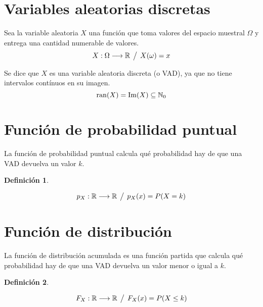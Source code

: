 \documentclass[a5paper,12pt,twoside]{book}
\newtheorem{defn}{{Definición}}[chapter]
\begin{document}
\section{Variables aleatorias discretas}

Sea la variable aleatoria $X$ una función que toma valores del espacio muestral $\Omega$ y entrega una cantidad numerable de valores.
\begin{equation*}
    X: \Omega \longrightarrow \mathbb{R} \hspace{1ex} \big/ \hspace{1ex} X(\omega) = x
\end{equation*}

Se dice que $X$ es una variable aleatoria discreta (o VAD), ya que no tiene intervalos contínuos en su imagen.
\begin{equation*}
    \operatorname{ran}(X) = \operatorname{Im}(X) \subseteq \mathbb{N}_0
\end{equation*}


\section{Función de probabilidad puntual}

La función de probabilidad puntual calcula qué probabilidad hay de que una VAD devuelva un valor $k$.

\begin{mdframed}[style=DefinitionFrame]
    \begin{defn}
    \end{defn}
    \begin{equation*}
        p_X: \mathbb{R} \longrightarrow \mathbb{R} \hspace{1ex} \big/ \hspace{1ex} p_X(x) = P(X=k)
    \end{equation*}
\end{mdframed}


\section{Función de distribución}

La función de distribución acumulada es una función partida que calcula qué probabilidad hay de que una VAD devuelva un valor menor o igual a $k$.

\begin{mdframed}[style=DefinitionFrame]
    \begin{defn}
    \end{defn}
    \begin{equation*}
        F_X: \mathbb{R} \longrightarrow \mathbb{R} \hspace{1ex} \big/ \hspace{1ex} F_X(x) = P(X \leq k)
    \end{equation*}
\end{mdframed}
\end{document}
